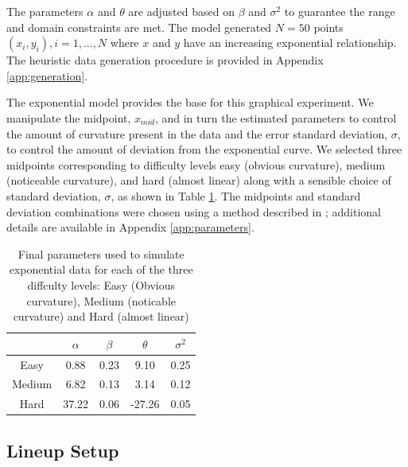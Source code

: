 \documentclass[]{interact}
\theoremstyle{plain}%
\theoremstyle{definition}
\theoremstyle{remark}
\begin{document}
\noindent The parameters \(\alpha\) and \(\theta\) are adjusted based on
\(\beta\) and \(\sigma^2\) to guarantee the range and domain constraints
are met. The model generated \(N = 50\) points
\((x_i, y_i), i = 1,...,N\) where \(x\) and \(y\) have an increasing
exponential relationship. The heuristic data generation procedure is
provided in Appendix \ref{app:generation}.

The exponential model provides the base for this graphical experiment.
We manipulate the midpoint, \(x_{mid}\), and in turn the estimated
parameters to control the amount of curvature present in the data and
the error standard deviation, \(\sigma\), to control the amount of
deviation from the exponential curve. We selected three midpoints
corresponding to difficulty levels easy (obvious curvature), medium
(noticeable curvature), and hard (almost linear) along with a sensible
choice of standard deviation, \(\sigma\), as shown in Table
\ref{tab:parameter-data}. The midpoints and standard deviation
combinations were chosen using a method described in
\cite{vanderplas_clusters_2017}; additional details are available in
Appendix \ref{app:parameters}.

\begin{table}

\caption{\label{tab:parameter-data}Final parameters used to simulate exponential data for each of the three diffculty levels: Easy (Obvious curvature), Medium (noticable curvature) and Hard (almost linear)}
\centering
\begin{tabular}[t]{ccccc}
\toprule
 & $\alpha$ & $\beta$ & $\theta$ & $\sigma^2$\\
\midrule
Easy & 0.88 & 0.23 & 9.10 & 0.25\\
Medium & 6.82 & 0.13 & 3.14 & 0.12\\
Hard & 37.22 & 0.06 & -27.26 & 0.05\\
\bottomrule
\end{tabular}
\end{table}

\hypertarget{lineup-setup}{%
\subsection{Lineup Setup}\label{lineup-setup}}
\end{document}
